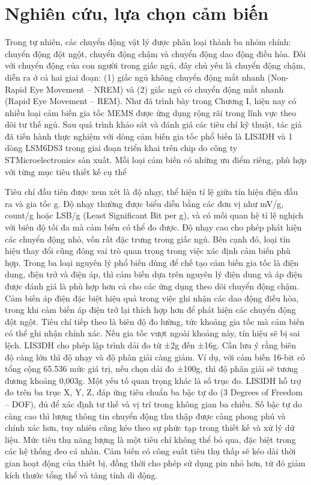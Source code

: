 
\section{Nghiên cứu, lựa chọn cảm biến \label{section_overview_propsed_method}}
Trong tự nhiên, các chuyển động vật lý được phân loại thành ba nhóm chính: chuyển động đột ngột, chuyển động chậm và chuyển động dao động điều hòa. Đối với chuyển động của con người trong giấc ngủ, đây chủ yếu là chuyển động chậm, diễn ra ở cả hai giai đoạn: (1) giấc ngủ không chuyển động mắt nhanh (Non-Rapid Eye Movement – NREM) và (2) giấc ngủ có chuyển động mắt nhanh (Rapid Eye Movement – REM). Như đã trình bày trong Chương I, hiện nay có nhiều loại cảm biến gia tốc MEMS được ứng dụng rộng rãi trong lĩnh vực theo dõi tư thế ngủ. Sau quá trình khảo sát và đánh giá các tiêu chí kỹ thuật, tác giả đã tiến hành thực nghiệm với dòng cảm biến gia tốc phổ biến là LIS3DH \cite{LIS3DH} và 1 dòng LSM6DS3 \cite{st_lsm6ds3_2017} trong giai đoạn triển khai trên chip do công ty STMicroelectronics sản xuất. Mỗi loại cảm biến có những ưu điểm riêng, phù hợp với từng mục tiêu thiết kế cụ thể


Tiêu chí đầu tiên được xem xét là độ nhạy, thể hiện tỉ lệ giữa tín hiệu điện đầu ra và gia tốc g. Độ nhạy thường được biểu diễn bằng các đơn vị như mV/g, count/g hoặc LSB/g (Least Significant Bit per g), và có mối quan hệ tỉ lệ nghịch với biên độ tối đa mà cảm biến có thể đo được. Độ nhạy cao cho phép phát hiện các chuyển động nhỏ, vốn rất đặc trưng trong giấc ngủ. Bên cạnh đó, loại tín hiệu thay đổi cũng đóng vai trò quan trọng trong việc xác định cảm biến phù hợp. Trong ba loại nguyên lý phổ biến dùng để chế tạo cảm biến gia tốc là điện dung, điện trở và điện áp, thì cảm biến dựa trên nguyên lý điện dung và áp điện được đánh giá là phù hợp hơn cả cho các ứng dụng theo dõi chuyển động chậm. Cảm biến áp điện đặc biệt hiệu quả trong việc ghi nhận các dao động điều hòa, trong khi cảm biến áp điện trở lại thích hợp hơn để phát hiện các chuyển động đột ngột. Tiêu chí tiếp theo là biên độ đo lường, tức khoảng gia tốc mà cảm biến có thể ghi nhận chính xác. Nếu gia tốc vượt ngoài khoảng này, tín hiệu sẽ bị sai lệch. LIS3DH cho phép lập trình dải đo từ ±2g đến ±16g. Cần lưu ý rằng biên độ càng lớn thì độ nhạy và độ phân giải càng giảm. Ví dụ, với cảm biến 16-bit có tổng cộng 65.536 mức giá trị, nếu chọn dải đo ±100g, thì độ phân giải sẽ tương đương khoảng 0,003g. Một yếu tố quan trọng khác là số trục đo. LIS3DH hỗ trợ đo trên ba trục X, Y, Z, đáp ứng tiêu chuẩn ba bậc tự do (3 Degrees of Freedom – DOF), đủ để xác định tư thế và vị trí trong không gian ba chiều. Số bậc tự do càng cao thì lượng thông tin chuyển động thu thập được càng phong phú và chính xác hơn, tuy nhiên cũng kéo theo sự phức tạp trong thiết kế và xử lý dữ liệu. Mức tiêu thụ năng lượng là một tiêu chí không thể bỏ qua, đặc biệt trong các hệ thống đeo cá nhân. Cảm biến có công suất tiêu thụ thấp sẽ kéo dài thời gian hoạt động của thiết bị, đồng thời cho phép sử dụng pin nhỏ hơn, từ đó giảm kích thước tổng thể và tăng tính di động.

